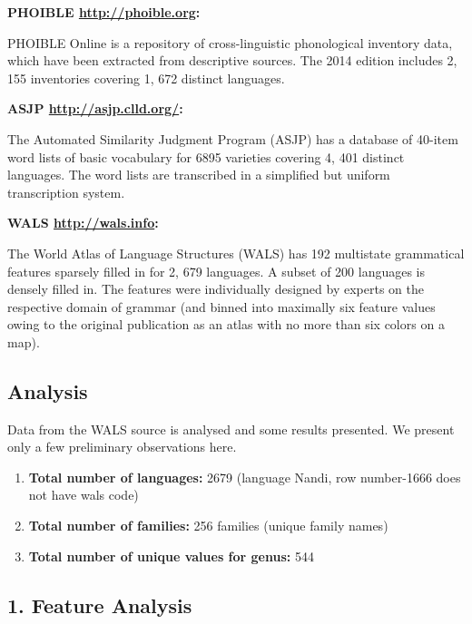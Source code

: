 \newpage

\textbf{PHOIBLE \url{ http://phoible.org}:}

PHOIBLE Online is a repository of cross-linguistic phonological inventory data, which have been extracted from descriptive sources. The 2014 edition includes 2, 155 inventories covering 1, 672 distinct languages.

\textbf{ASJP \url{ http://asjp.clld.org/}:}

The Automated Similarity Judgment Program (ASJP) has a database of 40-item word lists of basic vocabulary for 6895 varieties covering 4, 401 distinct languages. The word lists are transcribed in a simplified but uniform transcription system.

\textbf{WALS \url{http://wals.info}:}

The World Atlas of Language Structures (WALS) has 192 multistate grammatical features sparsely filled in for 2, 679 languages. A subset of 200 languages is densely filled in. The features were individually designed by experts on the respective domain of grammar (and binned into maximally six feature values owing to the original publication as an atlas with no more than six colors on a map).


\subsection*{Analysis}

Data from the WALS source is analysed and some results presented. We present only a few preliminary observations here.

\begin{enumerate}[{\rm 1)}]
\itemsep=0pt
\item \textbf{Total number of languages:} 2679 (language Nandi, row number-1666 does not have wals code)

 \item \textbf{Total number of families:} 256 families (unique family names)

 \item \textbf{Total number of unique values for genus:} 544

\end{enumerate}


\subsection*{1. Feature Analysis}

